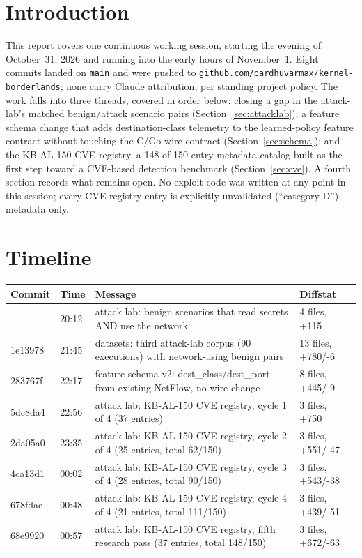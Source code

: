 \documentclass[11pt,a4paper]{article}
\begin{document}
\section*{Introduction}

This report covers one continuous working session, starting the evening of
October~31, 2026 and running into the early hours of November~1. Eight
commits landed on \texttt{main} and were pushed to
\texttt{github.com/pardhuvarmax/kernel-borderlands}; none carry Claude
attribution, per standing project policy. The work falls into three
threads, covered in order below: closing a gap in the attack-lab's matched
benign/attack scenario pairs (Section~\ref{sec:attacklab}); a feature
schema change that adds destination-class telemetry to the learned-policy
feature contract without touching the C/Go wire contract
(Section~\ref{sec:schema}); and the KB-AL-150 CVE registry, a
148-of-150-entry metadata catalog built as the first step toward a
CVE-based detection benchmark (Section~\ref{sec:cve}). A fourth section
records what remains open. No exploit code was written at any point in
this session; every CVE-registry entry is explicitly unvalidated
(``category D'') metadata only.

\clearpage

\section{Timeline}
\label{sec:timeline}

\begin{longtable}{@{}>{\ttfamily}p{1.7cm} p{2.1cm} p{7.6cm} p{2.6cm}@{}}
\toprule
\textbf{Commit} & \textbf{Time} & \textbf{Message} & \textbf{Diffstat} \\
\midrule
\endhead
8254628 & 20:12 & \normalfont attack lab: benign scenarios that read secrets AND use the network & 4 files, +115 \\
1e13978 & 21:45 & \normalfont datasets: third attack-lab corpus (90 executions) with network-using benign pairs & 13 files, +780/-6 \\
283767f & 22:17 & \normalfont feature schema v2: dest\_class/dest\_port from existing NetFlow, no wire change & 8 files, +445/-9 \\
5dc8da4 & 22:56 & \normalfont attack lab: KB-AL-150 CVE registry, cycle 1 of 4 (37 entries) & 3 files, +750 \\
2da05a0 & 23:35 & \normalfont attack lab: KB-AL-150 CVE registry, cycle 2 of 4 (25 entries, total 62/150) & 3 files, +551/-47 \\
4ca13d1 & 00:02 & \normalfont attack lab: KB-AL-150 CVE registry, cycle 3 of 4 (28 entries, total 90/150) & 3 files, +543/-38 \\
678fdae & 00:48 & \normalfont attack lab: KB-AL-150 CVE registry, cycle 4 of 4 (21 entries, total 111/150) & 3 files, +439/-51 \\
68e9920 & 00:57 & \normalfont attack lab: KB-AL-150 CVE registry, fifth research pass (37 entries, total 148/150) & 3 files, +672/-63 \\
\bottomrule
\end{longtable}
\end{document}
